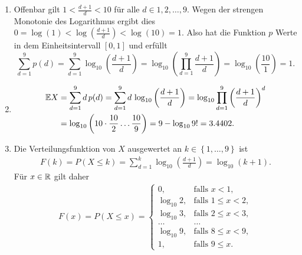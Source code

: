 \solution
\begin{enumerate}
    \item Offenbar gilt $1<\frac{d+1}{d}<10$ für alle $d\in{1,2,\hdots,9}$. Wegen der strengen Monotonie des Logarithmus ergibt dies
          $0=\log(1)<\log\left(\frac{d+1}{d}\right)<\log(10)=1$.
          Also hat die Funktion $p$ Werte in dem Einheitsintervall $\left[ 0,1 \right]$ und erfüllt
        \begin{equation*}
            \sum_{d=1}^{9} p(d) = \sum_{d=1}^9 \log_{10} \left(\frac{d+1}{d} \right) = \log_{10} \left(\prod_{d=1}^9 \frac{d+1}{d} \right) = \log_{10} \left(\frac{10}{1}\right)=1.
        \end{equation*}
    \item \begin{align*}
            \mathbb{E} X &= \sum_{d=1}^{9} d\, p(d) 
            = \sum_{d=1}^{9} d\, \log_{10} \left( \frac{d+1}{d} \right)
            = \log_{10} \prod_{d=1}^{9} \left( \frac{d+1}{d} \right)^{d} \\
            &= \log_{10} \left( 10 \cdot{} \frac{10}{2} \dots \frac{10}{9} \right) 
            = 9 - \log_{10} 9! = 3.4402.
        \end{align*}
    \item Die Verteilungsfunktion von $X$ ausgewertet an $k\in \left\{ 1,\dots ,9 \right\}$ ist
        \begin{align*}
            F(k) = P(X \le k) = \sum_{d=1}^{k} \log_{10} \left( \frac{d+1}{d} \right) = \log_{10} (k+1).
        \end{align*}
        Für $x\in\mathbb{R}$ gilt daher
        \begin{align*}
            F(x) = P(X \le x) = \begin{cases}
                0,           & \text{falls }       x < 1, \\
                \log_{10} 2, & \text{falls } 1 \le x < 2, \\
                \log_{10} 3, & \text{falls } 2 \le x < 3, \\
                \dots        & \dots \\
                \log_{10} 9, & \text{falls } 8 \le x < 9, \\
                1,           & \text{falls }  9 \le x.
            \end{cases}
        \end{align*}
\end{enumerate}

